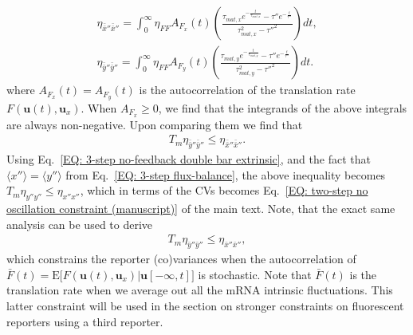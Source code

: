 \documentclass[%
 reprint,prx,
superscriptaddress,
%
%
%
%
%
%
%
%
%
 amsmath,amssymb,
 aps,
%
%
%
%
%
%
]{revtex4-2}
\begin{document}
{{\begin{align*}
 \eta_{\bar{\bar{x}}''\bar{\bar{x}}''} = \int_{0}^{\infty}\eta_{FF}A_{F_{x}}(t) \left( \frac{\tau_{mat,x}e^{-\frac{t}{\tau_{mat,x}}} - \tau''e^{-\frac{t}{\tau''}} }{\tau_{mat,x}^{2} - \tau''^2} \right)dt 
 , \\
 \eta_{\bar{\bar{y}}''\bar{\bar{y}}''} = \int_{0}^{\infty}\eta_{FF}A_{F_{y}}(t) \left( \frac{\tau_{mat,y}e^{-\frac{t}{\tau_{mat,y}}} - \tau''e^{-\frac{t}{\tau''}} }{\tau_{mat,y}^{2} - \tau''^2} \right)dt 
.
\end{align*}
where  $A_{F_{x}}(t) = A_{F_{y}}(t)$ is the autocorrelation of the translation rate $F(\mathbf{u}(t), \mathbf{u}_{x})$. When $A_{F_{x}} \geq 0$, we find that the integrands of the above integrals are 
always non-negative. Upon comparing them we find that 
\begin{align*}
 T_{m}\eta_{\bar{\bar{y}}''\bar{\bar{y}}''} \leq \eta_{\bar{\bar{x}}''\bar{\bar{x}}''} .
\end{align*}
Using Eq.~\eqref{EQ: 3-step no-feedback double bar extrinsic}, and the fact that $\langle x'' \rangle = \langle y'' \rangle$ from Eq.~\eqref{EQ: 3-step flux-balance}, the 
above inequality becomes $T_{m}\eta_{y''y''} \leq \eta_{x''x''}$, which in terms of the CVs becomes Eq.~\eqref{EQ: two-step no oscillation constraint (manuscript)} of the main text. Note, that the exact same analysis can be used to derive 
\begin{align}
 T_{m}\eta_{\bar{y}''\bar{y}''} \leq \eta_{\bar{x}''\bar{x}''} ,
 \label{EQ: fp strong constraint}
\end{align}
which constrains the reporter (co)variances when the autocorrelation of $\bar{F}(t) = \mathrm{E}\big[F(\mathbf{u}(t), \mathbf{u}_{x})|\mathbf{u}[-\infty,t]\big]$ is stochastic. Note that $\bar{F}(t)$ is the translation rate when we average out all the mRNA intrinsic fluctuations. This latter constraint will be used in the section on stronger constraints on fluorescent reporters using a third reporter.


{
}}}
\end{document}
